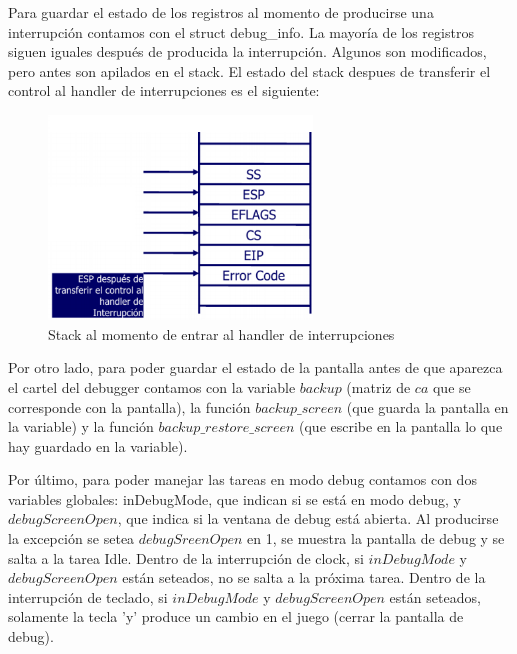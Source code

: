 \par{Para guardar el estado de los registros al momento de producirse una interrupci\'on contamos con el struct debug_info. La mayor\'ia de los registros siguen iguales despu\'es de producida la interrupci\'on. Algunos son modificados, pero antes son apilados en el stack. El estado del stack despues de transferir el control al handler de interrupciones es el siguiente:}

\begin{figure}[ht!]
\centering
\includegraphics[width=70mm]{imagenes/stack.png}
\caption{Stack al momento de entrar al handler de interrupciones}
\end{figure}

\par{Por otro lado, para poder guardar el estado de la pantalla antes de que aparezca el cartel del debugger contamos con la variable $backup$ (matriz de $ca$ que se corresponde con la pantalla), la funci\'on $backup\_screen$ (que guarda la pantalla en la variable) y la funci\'on $backup\_restore\_screen$ (que escribe en la pantalla lo que hay guardado en la variable).}

\par{Por \'ultimo, para poder manejar las tareas en modo debug contamos con dos variables globales: inDebugMode, que indican si se est\'a en modo debug, y $debugScreenOpen$, que indica si la ventana de debug est\'a abierta. Al producirse la excepci\'on se setea $debugSreenOpen$ en 1, se muestra la pantalla de debug y se salta a la tarea Idle. Dentro de la interrupci\'on de clock, si $inDebugMode$ y $debugScreenOpen$ est\'an seteados, no se salta a la pr\'oxima tarea. Dentro de la interrupci\'on de teclado, si $inDebugMode$ y $debugScreenOpen$ est\'an seteados, solamente la tecla 'y' produce un cambio en el juego (cerrar la pantalla de debug).}